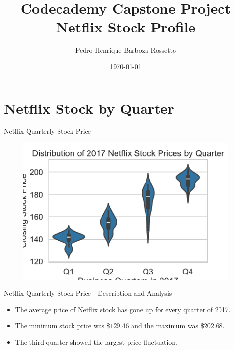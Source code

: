 \documentclass{beamer}
\title{Codecademy Capstone Project\\Netflix Stock Profile}
\author{Pedro Henrique Barboza Rossetto}
\date{\today}
\institute{}
\begin{document}
\maketitle

\begin{frame}
	\tableofcontents
\end{frame}

\section{Netflix Stock by Quarter}
\begin{frame}{Netflix Quarterly Stock Price}
	\begin{figure}
		\centering
		\includegraphics[width=\textwidth]{1-violin_plot_netflix_stock_by_quarter.pdf}
	\end{figure}
\end{frame}

\begin{frame}{Netflix Quarterly Stock Price - Description and Analysis}
	\begin{itemize}
		\item The average price of Netflix stock has gone up for every quarter of 2017.
		\item The minimum stock price was $\$ 129.46$ and the maximum was $\$ 202.68$.
		\item The third quarter showed the largest price fluctuation.
	\end{itemize}
\end{frame}
\end{document}
